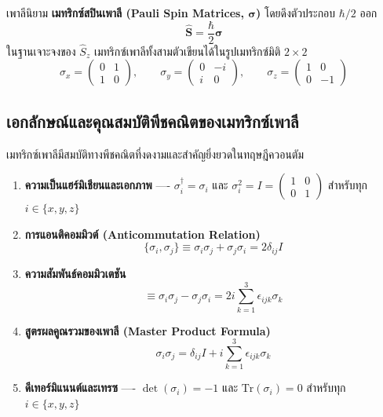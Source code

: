 เพาลีนิยาม \textbf{เมทริกซ์สปินเพาลี (Pauli Spin Matrices, $\boldsymbol{\sigma}$)} โดยดึงตัวประกอบ $\hbar/2$ ออก
\begin{equation}
\hat{\mathbf{S}} = \frac{\hbar}{2} \boldsymbol{\sigma}
\label{eq:spin_pauli_relation}
\end{equation}
ในฐานเจาะจงของ $\hat{S}_z$ เมทริกซ์เพาลีทั้งสามตัวเขียนได้ในรูปเมทริกซ์มิติ $2 \times 2$
\begin{equation}
\sigma_x = \begin{pmatrix} 0 & 1 \\ 1 & 0 \end{pmatrix}, \qquad \sigma_y = \begin{pmatrix} 0 & -i \\ i & 0 \end{pmatrix}, \qquad \sigma_z = \begin{pmatrix} 1 & 0 \\ 0 & -1 \end{pmatrix}
\label{eq:pauli_matrices_explicit}
\end{equation}

\subsection{เอกลักษณ์และคุณสมบัติพีชคณิตของเมทริกซ์เพาลี}
เมทริกซ์เพาลีมีสมบัติทางพีชคณิตที่งดงามและสำคัญยิ่งยวดในทฤษฎีควอนตัม
\begin{enumerate}
    \item \textbf{ความเป็นแฮร์มิเชียนและเอกภาพ} ---- $\sigma_i^\dagger = \sigma_i$ และ $\sigma_i^2 = I = \begin{pmatrix} 1 & 0 \\ 0 & 1 \end{pmatrix}$ สำหรับทุก $i \in \{x, y, z\}$
    \item \textbf{การแอนติคอมมิวต์ (Anticommutation Relation)}
    \begin{equation}
    \{ \sigma_i, \sigma_j \} \equiv \sigma_i \sigma_j + \sigma_j \sigma_i = 2\delta_{ij} I
    \end{equation}
    \item \textbf{ความสัมพันธ์คอมมิวเตชัน}
    \begin{equation}
    [ \sigma_i, \sigma_j ] \equiv \sigma_i \sigma_j - \sigma_j \sigma_i = 2i \sum_{k=1}^3 \epsilon_{ijk} \sigma_k
    \end{equation}
    \item \textbf{สูตรผลคูณรวมของเพาลี (Master Product Formula)}
    \begin{equation}
    \sigma_i \sigma_j = \delta_{ij} I + i \sum_{k=1}^3 \epsilon_{ijk} \sigma_k
    \label{eq:pauli_master_product}
    \end{equation}
    \item \textbf{ดีเทอร์มิแนนต์และเทรซ} ---- $\det(\sigma_i) = -1$ และ $\text{Tr}(\sigma_i) = 0$ สำหรับทุก $i \in \{x, y, z\}$
\end{enumerate}

